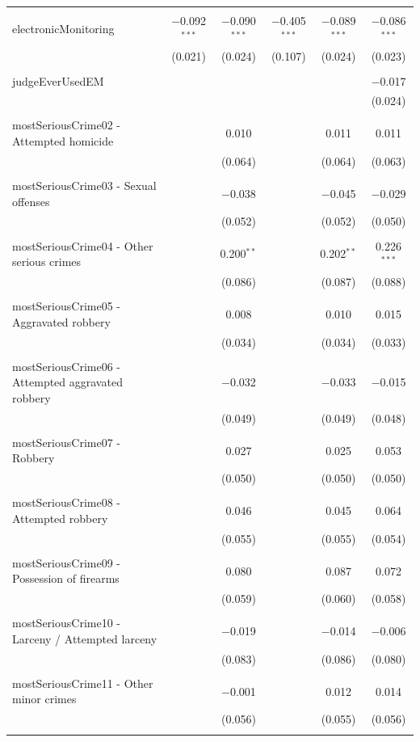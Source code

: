 \documentclass[a4paper,12pt]{article}
\begin{document}
\begin{table}[!htbp]
{\begin{tabular}{@{\extracolsep{5pt}}lccccc}
\hline \\[-1.8ex] 
 electronicMonitoring & $-$0.092$^{***}$ & $-$0.090$^{***}$ & $-$0.405$^{***}$ & $-$0.089$^{***}$ & $-$0.086$^{***}$ \\ 
  & (0.021) & (0.024) & (0.107) & (0.024) & (0.023) \\ 
  & & & & & \\ 
 judgeEverUsedEM &  &  &  &  & $-$0.017 \\ 
  &  &  &  &  & (0.024) \\ 
  & & & & & \\ 
 mostSeriousCrime02 - Attempted homicide &  & 0.010 &  & 0.011 & 0.011 \\ 
  &  & (0.064) &  & (0.064) & (0.063) \\ 
  & & & & & \\ 
 mostSeriousCrime03 - Sexual offenses &  & $-$0.038 &  & $-$0.045 & $-$0.029 \\ 
  &  & (0.052) &  & (0.052) & (0.050) \\ 
  & & & & & \\ 
 mostSeriousCrime04 - Other serious crimes &  & 0.200$^{**}$ &  & 0.202$^{**}$ & 0.226$^{***}$ \\ 
  &  & (0.086) &  & (0.087) & (0.088) \\ 
  & & & & & \\ 
 mostSeriousCrime05 - Aggravated robbery &  & 0.008 &  & 0.010 & 0.015 \\ 
  &  & (0.034) &  & (0.034) & (0.033) \\ 
  & & & & & \\ 
 mostSeriousCrime06 - Attempted aggravated robbery &  & $-$0.032 &  & $-$0.033 & $-$0.015 \\ 
  &  & (0.049) &  & (0.049) & (0.048) \\ 
  & & & & & \\ 
 mostSeriousCrime07 - Robbery &  & 0.027 &  & 0.025 & 0.053 \\ 
  &  & (0.050) &  & (0.050) & (0.050) \\ 
  & & & & & \\ 
 mostSeriousCrime08 - Attempted robbery &  & 0.046 &  & 0.045 & 0.064 \\ 
  &  & (0.055) &  & (0.055) & (0.054) \\ 
  & & & & & \\ 
 mostSeriousCrime09 - Possession of firearms &  & 0.080 &  & 0.087 & 0.072 \\ 
  &  & (0.059) &  & (0.060) & (0.058) \\ 
  & & & & & \\ 
 mostSeriousCrime10 - Larceny / Attempted larceny &  & $-$0.019 &  & $-$0.014 & $-$0.006 \\ 
  &  & (0.083) &  & (0.086) & (0.080) \\ 
  & & & & & \\ 
 mostSeriousCrime11 - Other minor crimes &  & $-$0.001 &  & 0.012 & 0.014 \\ 
  &  & (0.056) &  & (0.055) & (0.056) \\ 
  & & & & & \\ 
  

\end{tabular}}
\end{table}
\end{document}
